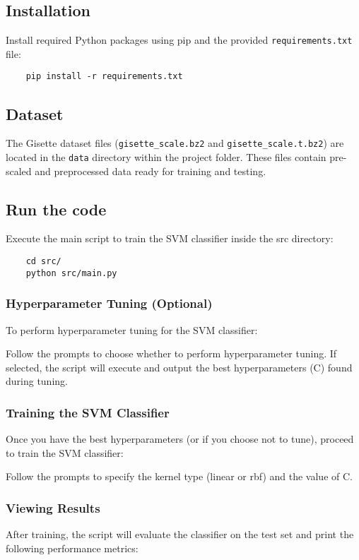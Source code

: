 \documentclass[10pt,a4paper]{article}
\newcounter{para}
\begin{document}
\subsection{Installation}
Install required Python packages using pip and the provided \texttt{requirements.txt} file:

\begin{verbatim}
	pip install -r requirements.txt
\end{verbatim}

\subsection{Dataset}
The Gisette dataset files (\texttt{gisette\_scale.bz2} and \texttt{gisette\_scale.t.bz2}) are located in the \texttt{data} directory within the project folder. These files contain pre-scaled and preprocessed data ready for training and testing.

\subsection{Run the code}
Execute the main script to train the SVM classifier inside the src directory:

\begin{verbatim}
	cd src/
	python src/main.py
\end{verbatim}

\subsubsection{Hyperparameter Tuning (Optional)}
To perform hyperparameter tuning for the SVM classifier:

Follow the prompts to choose whether to perform hyperparameter tuning. If selected, the script will execute and output the best hyperparameters (C) found during tuning.

\subsubsection{Training the SVM Classifier}
Once you have the best hyperparameters (or if you choose not to tune), proceed to train the SVM classifier:

Follow the prompts to specify the kernel type (linear or rbf) and the value of C.

\subsubsection{Viewing Results}
After training, the script will evaluate the classifier on the test set and print the following performance metrics:
\end{document}

